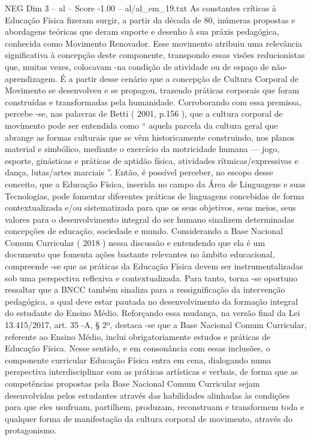 \begin{textsample}{NEG Dim 3 – al – Score -1.00 – al/al\_em\_19.txt}
As constantes críticas à Educação Física fizeram surgir, a partir da década de 80, inúmeras propostas e abordagens teóricas que deram suporte e desenho à sua práxis pedagógica, conhecida como Movimento Renovador.
Esse movimento atribuiu uma relevância significativa à concepção deste componente, transpondo essas visões reducionistas que, muitas vezes, colocavam -na condição de atividade ou de espaço de não-aprendizagem.
É a partir desse cenário que a concepção de Cultura Corporal de Movimento se desenvolveu e se propagou, trazendo práticas corporais que foram construídas e transformadas pela humanidade.
Corroborando com essa premissa, percebe -se, nas palavras de Betti ( 2001, p.156 ), que a cultura corporal de movimento pode ser entendida como “ aquela parcela da cultura geral que abrange as formas culturais que se vêm historicamente construindo, nos planos material e simbólico, mediante o exercício da motricidade humana — jogo, esporte, ginásticas e práticas de aptidão física, atividades rítmicas/expressivas e dança, lutas/artes marciais ”.
Então, é possível perceber, no escopo desse conceito, que a Educação Física, inserida no campo da Área de Linguagens e suas Tecnologias, pode fomentar diferentes práticas de linguagens concebidas de forma contextualizada e/ou sistematizada para que os seus objetivos, seus meios, seus valores para o desenvolvimento integral do ser humano sinalizem determinadas concepções de educação, sociedade e mundo.
Considerando a Base Nacional Comum Curricular ( 2018 ) nessa discussão e entendendo que ela é um documento que fomenta ações bastante relevantes no âmbito educacional, compreende -se que as práticas da Educação Física devem ser instrumentalizadas sob uma perspectiva reflexiva e contextualizada.
Para tanto, torna -se oportuno ressaltar que a BNCC também sinaliza para a ressignificação da intervenção pedagógica, a qual deve estar pautada no desenvolvimento da formação integral do estudante do Ensino Médio.
Reforçando essa mudança, na versão final da Lei 13.415/2017, art. 35 -A, § 2º, destaca -se que a Base Nacional Comum Curricular, referente ao Ensino Médio, inclui obrigatoriamente estudos e práticas de Educação Física.
Nesse sentido, e em consonância com essas inclusões, o componente curricular Educação Física entra em cena, dialogando numa perspectiva interdisciplinar com as práticas artísticas e verbais, de forma que as competências propostas pela Base Nacional Comum Curricular sejam desenvolvidas pelos estudantes através das habilidades alinhadas às condições para que eles usufruam, partilhem, produzam, reconstruam e transformem toda e qualquer forma de manifestação da cultura corporal de movimento, através do protagonismo.

\end{textsample}
